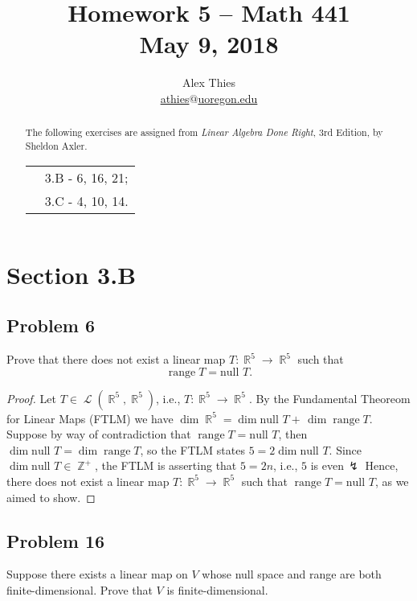 \documentclass[letterpaper, 12pt]{amsart}
\DeclareMathOperator{\Z}{\mathbb{Z}}				%
\DeclareMathOperator{\R}{\mathbb{R}}				%
\DeclareMathOperator{\Ell}{\mathscr{L}}				%
\renewcommand{\null}{\text{null }}					%
\DeclareMathOperator{\range}{\text{range }}			%
\theoremstyle{definition}  							%
\begin{document}
	\title{Homework 5  -- Math 441 \\ M\lowercase{ay 9, 2018}}
	\author{Alex Thies \\ \href{mailto:athies@uoregon.edu}{\lowercase{athies$@$uoregon.edu}}}

	\begin{abstract}
	The following exercises are assigned from \textit{Linear Algebra Done Right}, 3rd Edition, by Sheldon Axler. 
			\begin{tabular}{rl}
				& 3.B - 6, 16, 21; \\
				& 3.C - 4, 10, 14.
			\end{tabular}
	\end{abstract}

	\maketitle

	\section*{Section 3.B}
		\subsection*{Problem 6}
		Prove that there does not exist a linear map $T : \R^{5} \to \R^{5}$ such that $$\range T = \null T.$$

		\begin{proof}
		Let $T \in \Ell(\R^{5}, \R^{5})$, i.e., $T : \R^{5} \to \R^{5}$.
		By the Fundamental Theoreom for Linear Maps (FTLM) we have $\dim \R^{5} = \dim \null T + \, \dim \range T$.
		Suppose by way of contradiction that $\range T = \null T$, then $\dim \null T = \dim \range T$, so the FTLM states $5 = 2 \dim \null T$.
		Since $\dim \null T \in \Z^{+}$, the FTLM is asserting that $5 = 2n$, i.e., $5$ is even$\, \lightning$		
		Hence, there does not exist a linear map $T : \R^{5} \to \R^{5}$ such that $\range T = \null T$, as we aimed to show.
		\end{proof}

		\subsection*{Problem 16}
		Suppose there exists a linear map on $V$ whose null space and range are both finite-dimensional. 
		Prove that $V$ is finite-dimensional.
\end{document}
